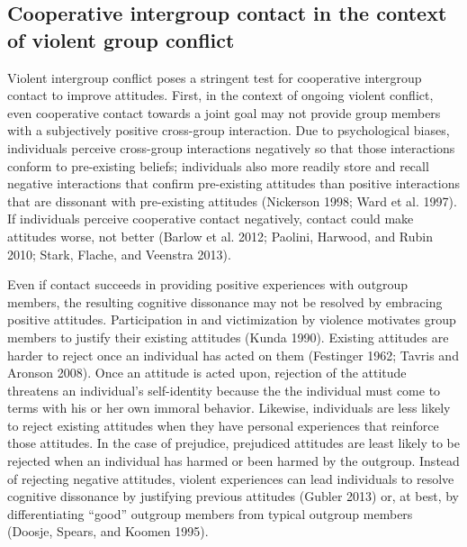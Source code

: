 \documentclass[11pt]{article}
\begin{document}
\hypertarget{cooperative-intergroup-contact-in-the-context-of-violent-group-conflict}{%
\subsection{Cooperative intergroup contact in the context of violent
group
conflict}\label{cooperative-intergroup-contact-in-the-context-of-violent-group-conflict}}

Violent intergroup conflict poses a stringent test for cooperative
intergroup contact to improve attitudes. First, in the context of
ongoing violent conflict, even cooperative contact towards a joint goal
may not provide group members with a subjectively positive cross-group
interaction. Due to psychological biases, individuals perceive
cross-group interactions negatively so that those interactions conform
to pre-existing beliefs; individuals also more readily store and recall
negative interactions that confirm pre-existing attitudes than positive
interactions that are dissonant with pre-existing attitudes (Nickerson
1998; Ward et al. 1997). If individuals perceive cooperative contact
negatively, contact could make attitudes worse, not better (Barlow et
al. 2012; Paolini, Harwood, and Rubin 2010; Stark, Flache, and Veenstra
2013).

Even if contact succeeds in providing positive experiences with outgroup
members, the resulting cognitive dissonance may not be resolved by
embracing positive attitudes. Participation in and victimization by
violence motivates group members to justify their existing attitudes
(Kunda 1990). Existing attitudes are harder to reject once an individual
has acted on them (Festinger 1962; Tavris and Aronson 2008). Once an
attitude is acted upon, rejection of the attitude threatens an
individual's self-identity because the the individual must come to terms
with his or her own immoral behavior. Likewise, individuals are less
likely to reject existing attitudes when they have personal experiences
that reinforce those attitudes. In the case of prejudice, prejudiced
attitudes are least likely to be rejected when an individual has harmed
or been harmed by the outgroup. Instead of rejecting negative attitudes,
violent experiences can lead individuals to resolve cognitive dissonance
by justifying previous attitudes (Gubler 2013) or, at best, by
differentiating ``good'' outgroup members from typical outgroup members
(Doosje, Spears, and Koomen 1995).
\end{document}
